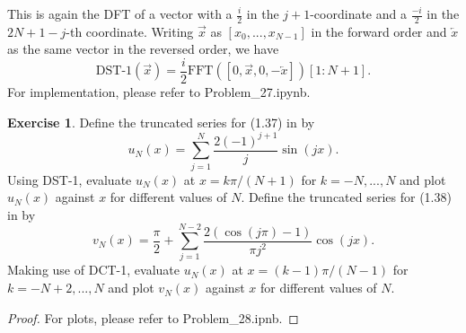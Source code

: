 \documentclass{amsart}
\theoremstyle{plain}
\theoremstyle{definition}
\newtheorem{exer}{Exercise}[section]
\begin{document}
This is again the DFT of a vector with a $\frac{i}{2}$ in the $j+1$-coordinate and a $\frac{-i}{2}$ in the $2N+1-j$-th coordinate. Writing $\overrightarrow{x}$ as $[x_0,...,x_{N-1}]$ in the forward order and $\overleftarrow{x}$ as the same vector in the reversed order, we have 
$$\text{DST-1}\left(\overrightarrow{x}\right) = \frac{i}{2}\text{FFT}\left([0,\overrightarrow{x},0,-\overleftarrow{x}]\right)[1:N+1].$$
For implementation, please refer to Problem\_27.ipynb.
\begin{exer}
    Define the truncated series for (1.37) in \cite{lord2014introduction} by
$$u_N (x) = \sum_{j=1}^N \frac{2\left(-1\right)^{j+1}}{j}\sin(jx).$$
Using DST-1, evaluate $u_N(x)$ at $x = k\pi/(N +1)$ for $k = -N,...,N$ and plot $u_N(x)$
against $x$ for different values of $N$. Define the truncated series for (1.38) in \cite{lord2014introduction} by
$$v_N (x) = \frac{\pi}{2}+ \sum_{j=1}^{N-2} \frac{2\left(\cos(j\pi)-1\right)}{\pi j^2}\cos(jx).$$
Making use of DCT-1, evaluate $u_N(x)$ at $x =(k -1)\pi/(N-1)$ for $k =-N +2,...,N$
and plot $v_N (x)$ against $x$ for different values of $N$.

\end{exer}
\begin{proof}
    For plots, please refer to Problem\_28.ipnb. 
\end{proof}

\printbibliography
\end{document}
